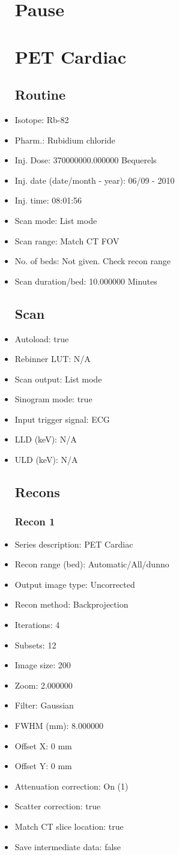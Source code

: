 \documentclass[12pt]{article}
\begin{document}
\begin{itemize}
\section{Pause}
\section{PET Cardiac}\subsection{Routine}
\item Isotope: Rb-82
\item Pharm.: Rubidium chloride
\item Inj. Dose: 370000000.000000 Bequerels
\item Inj. date (date/month - year): 06/09 - 2010
\item Inj. time: 08:01:56
\item Scan mode: List mode
\item Scan range: Match CT FOV
\item No. of beds: Not given. Check recon range
\item Scan duration/bed: 10.000000 Minutes
\subsection{Scan}
\item Autoload: true
\item Rebinner LUT: N/A
\item Scan output: List mode
\item Sinogram mode: true
\item Input trigger signal: ECG
\item LLD (keV): N/A
\item ULD (keV): N/A
\subsection{Recons}
\subsubsection{Recon 1}
\item Series description: PET Cardiac
\item Recon range (bed): Automatic/All/dunno
\item Output image type: Uncorrected
\item Recon method: Backprojection
\item Iterations: 4
\item Subsets: 12
\item Image size: 200
\item Zoom: 2.000000
\item Filter: Gaussian
\item FWHM (mm): 8.000000
\item Offset X: 0 mm
\item Offset Y: 0 mm
\item Attenuation correction: On (1)
\item Scatter correction: true
\item Match CT slice location: true
\item Save intermediate data: false

\end{itemize}
\end{document}
